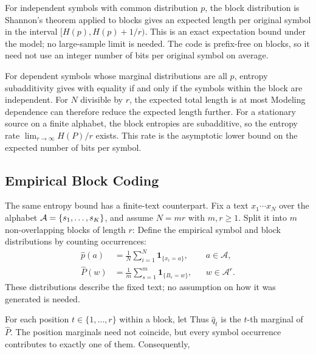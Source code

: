 For independent symbols with common distribution $p$, the block distribution is
Shannon's theorem applied to blocks gives an expected length per original symbol in the interval $[H(p),H(p)+1/r)$. This is an exact expectation bound under the model; no large-sample limit is needed. The code is prefix-free on blocks, so it need not use an integer number of bits per original symbol on average.

For dependent symbols whose marginal distributions are all $p$, entropy subadditivity gives
with equality if and only if the symbols within the block are independent. For $N$ divisible by $r$, the expected total length is at most
Modeling dependence can therefore reduce the expected length further. For a stationary source on a finite alphabet, the block entropies are subadditive, so the entropy rate $\lim_{r\to\infty}H(P)/r$ exists. This rate is the asymptotic lower bound on the expected number of bits per symbol.


\subsection{Empirical Block Coding}
\label{sec-shannon-empirical-blocks}

The same entropy bound has a finite-text counterpart. Fix a text $x_1\cdots x_N$ over the alphabet $\mathcal A=\{s_1,\ldots,s_K\}$, and assume $N=mr$ with $m,r\geq1$. Split it into $m$ non-overlapping blocks of length $r$:
Define the empirical symbol and block distributions by counting occurrences:
\begin{align}
 \label{eq-empirical-symbol-distribution}
 \hat p(a)&=\frac1N\sum_{i=1}^N\mathbf1_{\{x_i=a\}},
 &&a\in\mathcal A,\\
 \label{eq-empirical-block-distribution}
 \hat P(w)&=\frac1m\sum_{s=1}^m\mathbf1_{\{B_s=w\}},
 &&w\in\mathcal A^r.
\end{align}
These distributions describe the fixed text; no assumption on how it was generated is needed.

For each position $t\in\{1,\ldots,r\}$ within a block, let
Thus $\hat q_t$ is the $t$-th marginal of $\hat P$. The position marginals need not coincide, but every symbol occurrence contributes to exactly one of them. Consequently,

